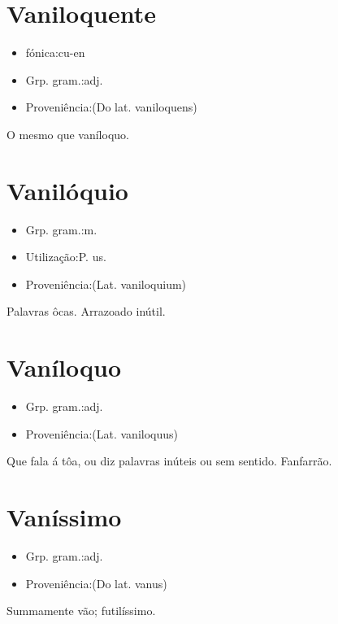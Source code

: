 \documentclass{article}
\begin{document}
\section{Vaniloquente}
\begin{itemize}
\item {fónica:cu-en}
\end{itemize}
\begin{itemize}
\item {Grp. gram.:adj.}
\end{itemize}
\begin{itemize}
\item {Proveniência:(Do lat. \textunderscore vaniloquens\textunderscore )}
\end{itemize}
O mesmo que \textunderscore vaníloquo\textunderscore .
\section{Vanilóquio}
\begin{itemize}
\item {Grp. gram.:m.}
\end{itemize}
\begin{itemize}
\item {Utilização:P. us.}
\end{itemize}
\begin{itemize}
\item {Proveniência:(Lat. \textunderscore vaniloquium\textunderscore )}
\end{itemize}
Palavras ôcas.
Arrazoado inútil.
\section{Vaníloquo}
\begin{itemize}
\item {Grp. gram.:adj.}
\end{itemize}
\begin{itemize}
\item {Proveniência:(Lat. \textunderscore vaniloquus\textunderscore )}
\end{itemize}
Que fala á tôa, ou diz palavras inúteis ou sem sentido.
Fanfarrão.
\section{Vaníssimo}
\begin{itemize}
\item {Grp. gram.:adj.}
\end{itemize}
\begin{itemize}
\item {Proveniência:(Do lat. \textunderscore vanus\textunderscore )}
\end{itemize}
Summamente vão; futilíssimo.
\end{document}
